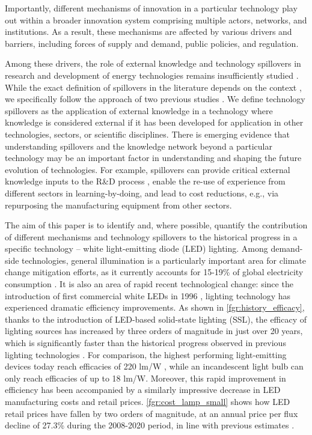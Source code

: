 \documentclass[parskip=full]{article}
\begin{document}
Importantly, different mechanisms of innovation in a particular technology play out within a broader innovation system comprising multiple actors, networks, and institutions\cite{grubler2012policies, Anadon2016}. As a result, these mechanisms are affected by various drivers and barriers, including forces of supply and demand\cite{Mowery1979}, public policies, and regulation\cite{anadon2009policy}.

Among these drivers, the role of external knowledge and technology spillovers in research and development of energy technologies remains insufficiently studied \cite{Stephan2021}. While the exact definition of spillovers in the literature depends on the context \cite{Nemet2012, kolesnikov2021spillovers}, we specifically follow the approach of two previous studies \cite{Stephan2021, kolesnikov2021spillovers}. We define technology spillovers as the application of external knowledge in a technology where knowledge is considered external if it has been developed for application in other technologies, sectors, or scientific disciplines. There is emerging evidence that understanding spillovers and the knowledge network beyond a particular technology may be an important factor in understanding \cite{Pichler2020, iea2020cleanenergy} and shaping \cite{Clark2016, Stephan2021} the future evolution of technologies. For example, spillovers can provide critical external knowledge inputs to the R\&D process \cite{kolesnikov2021spillovers}, enable the re-use of experience from different sectors in learning-by-doing\cite{iea2020cleanenergy}, and lead to cost reductions, e.g., via repurposing the manufacturing equipment from other sectors\cite{Stephan2021}.

The aim of this paper is to identify and, where possible, quantify the contribution of different mechanisms and technology spillovers to the historical progress in a specific technology – white light-emitting diode (LED) lighting. Among demand-side technologies, general illumination is a particularly important area for climate change mitigation efforts, as it currently accounts for 15-19\% of global electricity consumption \cite{Zissis2016,doe_electricity}. It is also an area of rapid recent technological change: since the introduction of first commercial white LEDs in 1996 \cite{Nakamura2013}, lighting technology has experienced dramatic efficiency improvements. As shown in \cref{fgr:history_efficacy}, thanks to the introduction of LED-based solid-state lighting (SSL), the efficacy of lighting sources has increased by three orders of magnitude in just over 20 years, which is significantly faster than the historical progress observed in previous lighting technologies \cite{weinold2021quantifying}. For comparison, the highest performing light-emitting devices today reach efficacies of 220 lm/W \cite{lumistrips2021mid}, while an incandescent light bulb can only reach efficacies of up to 18 lm/W. Moreover, this rapid improvement in efficiency has been accompanied by a similarly impressive decrease in LED manufacturing costs and retail prices. \cref{fgr:cost_lamp_small} shows how LED retail prices have fallen by two orders of magnitude, at an annual price per flux decline of 27.3\% during the 2008-2020 period, in line with previous estimates \cite{Gerke2020}.
\end{document}
